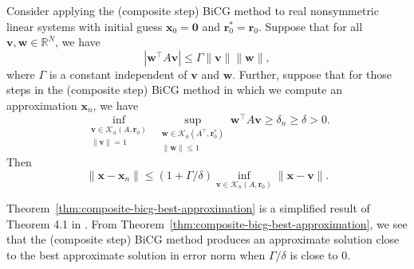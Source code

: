 \par{}
\begin{Theorem}[\BookCite{16}]\label{thm:composite-bicg-best-approximation}
{Consider applying the (composite step) BiCG method to real nonsymmetric linear systems with initial guess $\bm x_0=\bm0$ and $\bm r_0^{*}=\bm r_0$. Suppose that for all $\bm v,\bm w\in\mathbb R^N$, we have}
\[|\bm w^{\top}A\bm v|\le\Gamma\|\bm v\|\|\bm w\|,\]
{where $\Gamma$ is a constant independent of $\bm v$ and $\bm w$. Further, suppose that for those steps in the (composite step) BiCG method in which we compute an approximation $\bm x_n$, we have}
\[\inf_{\substack{\bm v\in\mathcal K_n(A,\bm r_0)\\\|\bm v\|=1}}\ \sup_{\substack{\bm w\in\mathcal K_n(A^{\top},\bm r_0^{*})\\\|\bm w\|\le1}}\bm w^{\top}A\bm v\ge\delta_n\ge\delta>0.\]
{Then}
\[\|\bm x-\bm x_n\|\le(1+\Gamma/\delta)\inf_{\bm v\in\mathcal K_n(A,\bm r_0)}\|\bm x-\bm v\|.\]
\end{Theorem}
{Theorem\ \ref{thm:composite-bicg-best-approximation} is a simplified result of Theorem 4.1 in . From Theorem\ \ref{thm:composite-bicg-best-approximation}, we see that the (composite step) BiCG method produces an approximate solution close to the best approximate solution in error norm when $\Gamma/\delta$ is close to 0.}
